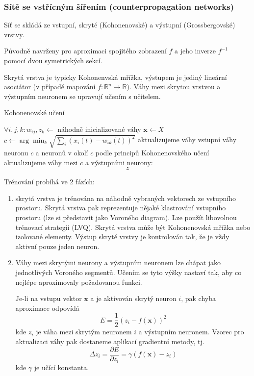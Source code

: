 \documentclass[11pt]{report} %
\newcommand{\R}{\mathbb{R}}
\renewcommand{\vec}[1]{\mathbf{#1}}
\numberwithin{equation}{section}
\begin{document}
\subsubsection{Sítě se vstřícným šířením (counterpropagation networks)}
Síť se skládá ze vstupní, skryté (Kohonenovské) a výstupní (Grossbergovské) vrstvy.

Původně navrženy pro aproximaci spojitého zobrazení $f$ a jeho inverze $f^{-1}$ pomocí dvou symetrických sekcí.

Skrytá vrstva je typicky Kohonenvská mřížka, výstupem je jediný lineární asociátor (v případě mapování $f : \R^n \to \R$). Váhy mezi skrytou vrstvou a výstupním neuronem se upravují učením s učitelem.

\bigskip
\begin{algorithm}[H]
	\caption{Kohonenovské učení}
	\begin{algorithmic}[1]
		\State $\forall i,j,k : w_{ij}, z_{k} \gets$ náhodně inicializované váhy
		\State $\vec{x} \gets X$ 
		\State $c \gets \arg\min_k\sqrt{\sum_{i} (x_i(t) - w_{ik}(t))^2}$ 
		\State aktualizujeme váhy vstupní váhy neuronu $c$ a neuronů v okolí $c$ podle principů Kohonenovského učení
		\State aktualizujeme váhy mezi $c$ a výstupními neurony:$$z$$ 
	\end{algorithmic}
\end{algorithm}	

Trénování probíhá ve 2 fázích:
\begin{enumerate}
	\item skrytá vrstva je trénována na náhodně vybraných vektorech ze vstupního prostoru. Skrytá vrstva pak reprezentuje nějaké klastrování vstupního prostoru (lze si představit jako Voroného diagram). Lze použít libovolnou trénovací strategii (LVQ). Skrytá vrstva může být Kohonenovská mřížka nebo izolované elementy. Výstup skryté vrstvy je kontrolován tak, že je vždy aktivní pouze jeden neuron.
	
	\item Váhy mezi skrytými neurony a výstupním neuronem lze chápat jako  jednotlivých Voroného segmentů. Učením se tyto výšky nastaví tak, aby co nejlépe aproximovaly požadovanou funkci. 
	
	Je-li na vstupu vektor $\vec{x}$ a je aktivován skrytý neuron $i$, pak chyba aproximace odpovídá
	$$E = \frac{1}{2}(z_i - f(\vec{x}))^2$$
	kde $z_i$ je váha mezi skrytým neuronem $i$ a výstupním neuronem. Vzorec pro aktualizaci váhy pak dostaneme aplikací gradientní metody, tj.
	$$\Delta z_i = \frac{\partial E}{\partial z_i} = \gamma (f(\vec{x}) - z_i)$$
	kde $\gamma$ je učící konstanta.
\end{enumerate}
\end{document}
